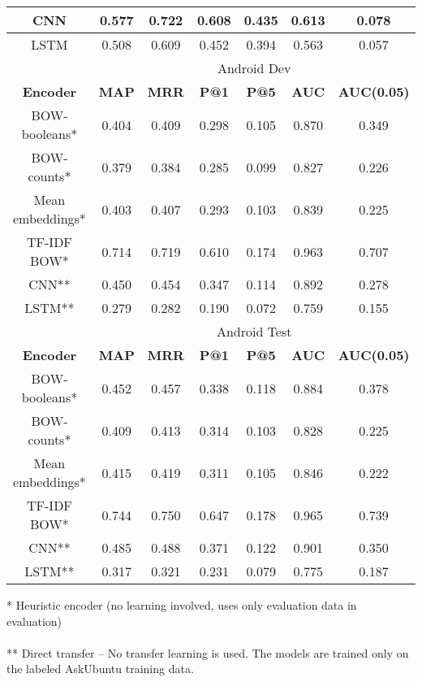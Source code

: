 \documentclass[12pt]{article}
\begin{document}
\begin{center}
\begin{tabular}{|c||c|c|c|c||c|c|}
			\cellcolor{green!15}CNN & 0.577 & 0.722 & 0.608 & 0.435 & 0.613 & 0.078 \\ \hline
			\cellcolor{green!15}LSTM & 0.508 & 0.609 & 0.452 & 0.394 & 0.563 & 0.057 \\ \hline
			\hline
			\cellcolor{gray!15}
				& \multicolumn{6}{c|}{\cellcolor{gray!15}Android Dev} \\ \hline
			\cellcolor{gray!15}\textbf{Encoder} & \cellcolor{gray!15}\textbf{MAP} & \cellcolor{gray!15}\textbf{MRR}
				& \cellcolor{gray!15}\textbf{P@1} & \cellcolor{gray!15}\textbf{P@5}
				& \cellcolor{gray!15}\textbf{AUC} & \cellcolor{gray!15}\textbf{AUC(0.05)} \\ \hline\hline
			\cellcolor{red!15}BOW-booleans* & 0.404 & 0.409 & 0.298 & 0.105 & 0.870 & 0.349 \\ \hline
			\cellcolor{red!15}BOW-counts* & 0.379 & 0.384 & 0.285 & 0.099 & 0.827 & 0.226 \\ \hline
			\cellcolor{red!15}Mean embeddings* & 0.403 & 0.407 & 0.293 & 0.103 & 0.839 & 0.225 \\ \hline
			\cellcolor{red!15}TF-IDF BOW* & 0.714 & 0.719 & 0.610 & 0.174 & 0.963 & 0.707 \\ \hline\hline
			\cellcolor{green!15}CNN** & 0.450 & 0.454 & 0.347 & 0.114 & 0.892 & 0.278 \\ \hline
			\cellcolor{green!15}LSTM** & 0.279 & 0.282 & 0.190 & 0.072 & 0.759 & 0.155 \\ \hline
			\hline
			\cellcolor{gray!15}
				& \multicolumn{6}{c|}{\cellcolor{gray!15}Android Test} \\ \hline
			\cellcolor{gray!15}\textbf{Encoder} & \cellcolor{gray!15}\textbf{MAP} & \cellcolor{gray!15}\textbf{MRR}
				& \cellcolor{gray!15}\textbf{P@1} & \cellcolor{gray!15}\textbf{P@5}
				& \cellcolor{gray!15}\textbf{AUC} & \cellcolor{gray!15}\textbf{AUC(0.05)} \\ \hline\hline
			\cellcolor{red!15}BOW-booleans* & 0.452 & 0.457 & 0.338 & 0.118 & 0.884 & 0.378 \\ \hline
			\cellcolor{red!15}BOW-counts* & 0.409 & 0.413 & 0.314 & 0.103 & 0.828 & 0.225 \\ \hline
			\cellcolor{red!15}Mean embeddings* & 0.415 & 0.419 & 0.311 & 0.105 & 0.846 & 0.222 \\ \hline
			\cellcolor{red!15}TF-IDF BOW* & 0.744 & 0.750 & 0.647 & 0.178 & 0.965 & 0.739 \\ \hline\hline
			\cellcolor{green!15}CNN** & 0.485 & 0.488 & 0.371 & 0.122 & 0.901 & 0.350 \\ \hline
			\cellcolor{green!15}LSTM** & 0.317 & 0.321 & 0.231 & 0.079 & 0.775 & 0.187 \\ \hline
		\end{tabular}
	\end{center}
	* Heuristic encoder (no learning involved, uses only evaluation data in evaluation) \\\\
	** Direct transfer -- No transfer learning is used. The models are trained only on the labeled AskUbuntu training data.
\end{document}
